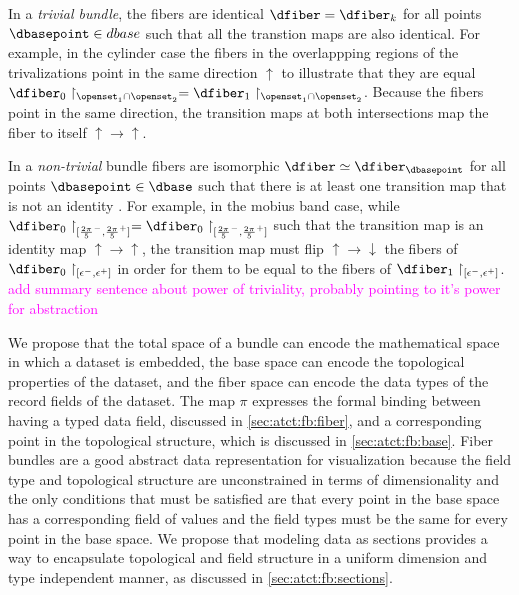 \documentclass[10pt,journal,compsoc]{IEEEtran}
\newcommand{\note}[1]{\textcolor{magenta}{#1}}
\theoremstyle{definition}
\theoremstyle{remark}
\begin{document}
In a \textit{trivial bundle}, the fibers are identical $\dfiber = \dfiber_{k}$ for all points $\dbasepoint \in dbase$ such that all the transtion maps are also identical. For example, in the cylinder case the fibers in the overlappping regions of the trivalizations point in the same direction $\uparrow$ to illustrate that they are equal $\dfiber_0\restriction_{\openset_1\cap\openset_2} = \dfiber_{1}\restriction_{\openset_1\cap\openset_2}$. Because the fibers point in the same direction, the  transition maps at both intersections map the fiber to itself $\uparrow\rightarrow\uparrow$.

In a \textit{non-trivial} bundle fibers are isomorphic $\dfiber \simeq \dfiber_{\dbasepoint}$ for all points $\dbasepoint \in \dbase$ such that there is at least one transition map that is not an identity \cite{hatcherAlgebraicTopology2002}. For example, in the mobius band case, while $\dfiber_{0}\restriction_{[{\frac{2\pi}{5}}^{-}, {\frac{2\pi}{5}}^{+}]} = \dfiber_{0}\restriction_{[{\frac{2\pi}{5}}^{-}, {\frac{2\pi}{5}}^{+}]}$ such that the transition map is an identity map $\uparrow\rightarrow\uparrow$, the transition map must flip  $\uparrow \rightarrow \downarrow$ the fibers of $\dfiber_0\restriction_{[\epsilon^{-}, \epsilon^{+}]}$ in order for them to be equal to the fibers of $\dfiber_1\restriction_{[\epsilon^{-}, \epsilon^{+}]}$. 
\note{add summary sentence about power of triviality, probably pointing to it's power for abstraction}

We propose that the total space of a bundle can encode the mathematical space in which a  dataset is embedded, the base space can encode the topological properties of the dataset, and the fiber space can encode the data types of the record fields of the dataset. The map $\pi$ expresses the formal binding between having a typed data field, discussed in \autoref{sec:atct:fb:fiber}, and a corresponding point in the topological structure, which is discussed in \autoref{sec:atct:fb:base}. Fiber bundles are a good abstract data representation for visualization because the field type and topological structure are unconstrained in terms of dimensionality and the only conditions that must be satisfied are that every point in the base space has a corresponding field of values and the field types must be the same for every point in the base space. We propose that modeling data as sections provides a way to encapsulate topological and field structure in a uniform dimension and type independent manner, as discussed in \autoref{sec:atct:fb:sections}.
\end{document}

